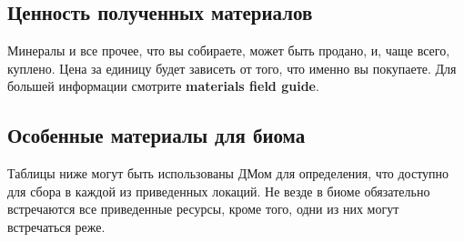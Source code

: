 \documentclass[a4paper, 9pt, twocolumn]{book}
\begin{document}
	\subsection{Ценность полученных материалов}
	
	Минералы и все прочее, что вы собираете, может быть продано, и, чаще всего, куплено. Цена за единицу будет зависеть от того, что именно вы покупаете. Для большей информации смотрите \textbf{materials field guide}.
	
	\subsection{Особенные материалы для биома}
	
	Таблицы ниже могут быть использованы ДМом для определения, что доступно для сбора в каждой из приведенных локаций. Не везде в биоме обязательно встречаются все приведенные ресурсы, кроме того, одни из них могут встречаться реже. 
	
\end{document}

